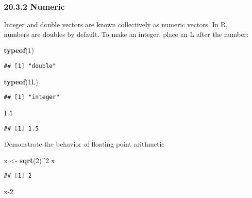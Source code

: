\documentclass[
]{article}
\newenvironment{Shaded}{\begin{snugshade}}{\end{snugshade}}
\newcommand{\DecValTok}[1]{\textcolor[rgb]{0.00,0.00,0.81}{#1}}
\newcommand{\FloatTok}[1]{\textcolor[rgb]{0.00,0.00,0.81}{#1}}
\newcommand{\FunctionTok}[1]{\textcolor[rgb]{0.13,0.29,0.53}{\textbf{#1}}}
\newcommand{\NormalTok}[1]{#1}
\newcommand{\OtherTok}[1]{\textcolor[rgb]{0.56,0.35,0.01}{#1}}
\newcommand{\SpecialCharTok}[1]{\textcolor[rgb]{0.81,0.36,0.00}{\textbf{#1}}}
\begin{document}
\hypertarget{numeric}{%
\subsubsection{20.3.2 Numeric}\label{numeric}}

Integer and double vectors are known collectively as numeric vectors. In
R, numbers are doubles by default. To make an integer, place an L after
the number:

\begin{Shaded}
\begin{Highlighting}[]
\FunctionTok{typeof}\NormalTok{(}\DecValTok{1}\NormalTok{)}
\end{Highlighting}
\end{Shaded}

\begin{verbatim}
## [1] "double"
\end{verbatim}

\begin{Shaded}
\begin{Highlighting}[]
\FunctionTok{typeof}\NormalTok{(1L)}
\end{Highlighting}
\end{Shaded}

\begin{verbatim}
## [1] "integer"
\end{verbatim}

\begin{Shaded}
\begin{Highlighting}[]
\FloatTok{1.5}
\end{Highlighting}
\end{Shaded}

\begin{verbatim}
## [1] 1.5
\end{verbatim}

Demonstrate the behavior of floating point arithmetic

\begin{Shaded}
\begin{Highlighting}[]
\NormalTok{x }\OtherTok{\textless{}{-}} \FunctionTok{sqrt}\NormalTok{(}\DecValTok{2}\NormalTok{)}\SpecialCharTok{\^{}}\DecValTok{2}
\NormalTok{x}
\end{Highlighting}
\end{Shaded}

\begin{verbatim}
## [1] 2
\end{verbatim}

\begin{Shaded}
\begin{Highlighting}[]
\NormalTok{x}\DecValTok{{-}2}
\end{Highlighting}
\end{Shaded}
\end{document}
